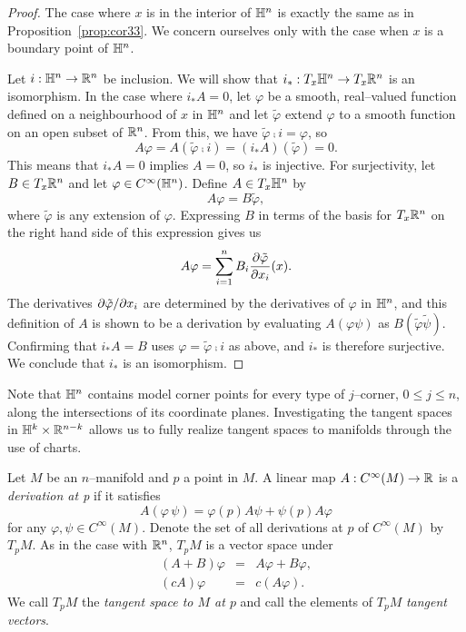 \begin{proof}
	The case where $x$ is in the interior of $\mathbb{H}^n$ is exactly the same as in Proposition~\ref{prop:cor33}.
	We concern ourselves only with the case when $x$ is a boundary point of $\mathbb{H}^n$.
	
	Let $i:\mathbb{H}^n\to\mathbb{R}^n$ be inclusion.
	We will show that $i_*:T_x\mathbb{H}^n\to T_x\mathbb{R}^n$ is an isomorphism.
	In the case where $i_*A=0$, let $\varphi$ be a smooth, real--valued function defined on a neighbourhood of $x$ in $\mathbb{H}^n$ and let $\tilde{\varphi}$ extend $\varphi$ to a smooth function on an open subset of $\mathbb{R}^n$.
	From this, we have $\tilde{\varphi}\comp i=\varphi$, so
	\[
		A\varphi = A(\tilde{\varphi}\comp i) = (i_* A)(\tilde{\varphi})=0.
	\]
	This means that $i_*A=0$ implies $A=0$, so $i_*$ is injective.
	For surjectivity, let $B\in T_x\mathbb{R}^n$ and let $\varphi\in C^\infty(\mathbb{H}^n)$.
	Define $A\in T_x \mathbb{H}^n$ by
	\[
		A\varphi = B\tilde{\varphi},
	\]
	where $\tilde{\varphi}$ is any extension of $\varphi$.
	Expressing $B$ in terms of the basis for $T_x \mathbb{R}^n$ on the right hand side of this expression gives us
	\[
		A\varphi = \sum_{i=1}^n B_i \frac{\partial \tilde{\varphi}}{\partial x_i}(x).
	\]
	The derivatives $\partial\tilde{\varphi}/\partial x_i$ are determined by the derivatives of $\varphi$ in $\mathbb{H}^n$, and this definition of $A$ is shown to be a derivation by evaluating $A(\varphi\psi)$ as $B(\tilde{\varphi}\tilde{\psi})$.
	Confirming that $i_*A=B$ uses $\varphi=\tilde{\varphi}\comp i$ as above, and $i_*$ is therefore surjective.
	We conclude that $i_*$ is an isomorphism.
\end{proof}

Note that $\mathbb{H}^n$ contains model corner points for every type of $j$--corner, $0\leq j\leq n$, along the intersections of its coordinate planes.
Investigating the tangent spaces in $\mathbb{H}^k\times\mathbb{R}^{n-k}$ allows us to fully realize tangent spaces to manifolds through the use of charts.

\begin{defn}
	Let $M$ be an $n$--manifold and $p$ a point in $M$.
	A linear map $A:C^\infty(M)\to\mathbb{R}$ is a \emph{derivation at p} if it satisfies
	\[
		A(\varphi\,\psi)=\varphi(p)A\psi+\psi(p)A\varphi
	\]
	for any $\varphi,\psi\in C^\infty(M)$.
	Denote the set of all derivations at $p$ of $C^\infty(M)$ by $T_p M$.
	As in the case with $\mathbb{R}^n$, $T_p M$ is a vector space under
	\[
		\begin{array}{rcl}
			(A+B)\varphi&=&A\varphi+B\varphi,\\
			(cA)\varphi&=&c(A\varphi).
		\end{array}
	\]
	We call $T_p M$ the \emph{tangent space to $M$ at $p$} and call the elements of $T_p M$ \emph{tangent vectors}.
\end{defn}

